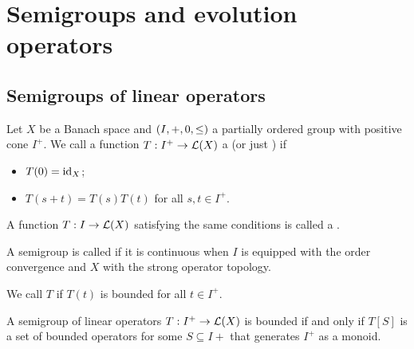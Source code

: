 \chapter{Semigroups and evolution operators}
\section{Semigroups of linear operators}
\begin{definition}
Let $X$ be a Banach space and $\left( I, +, 0, \leq \right)$ a partially ordered group with positive cone $I^+$. We call a function $T: I^+ \to \operatorname{\mathcal{L}}(X)$ a  (or just ) if
\begin{itemize}
\item $T(0) = \operatorname{id}_X$;
\item $T(s+t) = T(s)T(t)$ for all $s,t \in I^+$.
\end{itemize}
A function $T: I \to \operatorname{\mathcal{L}}(X)$ satisfying the same conditions is called a .

A semigroup is called  if it is continuous when $I$ is equipped with the order convergence and $X$ with the strong operator topology.

We call $T$  if $T(t)$ is bounded for all $t\in I^+$.
\end{definition}

\begin{lemma}
A semigroup of linear operators $T:I^+\to \operatorname{\mathcal{L}}(X)$ is bounded \textup{if and only if} $T[S]$ is a set of bounded operators for some $S\subseteq I+$ that generates $I^+$ as a monoid.
\end{lemma}

